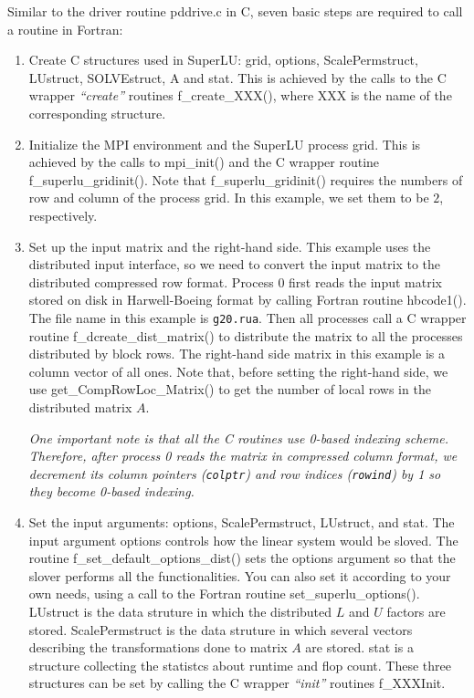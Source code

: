 Similar to the driver routine \textsf{pddrive.c} in C, seven basic steps are
required to call a {\superlud} routine in Fortran:
\begin{enumerate}

\item Create C structures used in SuperLU: \textsf{grid}, \textsf{options}, 
\textsf{ScalePermstruct}, \textsf{LUstruct}, \textsf{SOLVEstruct}, \textsf{A} 
and \textsf{stat}.
This is achieved by the calls to the C wrapper \emph{``create''} routines
\textsf{f\_create\_XXX()}, where \textsf{XXX} is the name of the corresponding
structure.

\item Initialize the MPI environment and the SuperLU process grid.
This is achieved by the calls to \textsf{mpi\_init()} and the C wrapper
routine \textsf{f\_superlu\_gridinit()}. Note that
\textsf{f\_superlu\_gridinit()} requires the numbers of row and column
of the process grid. In this example, we set them to be $2$, respectively.

\item Set up the input matrix and the right-hand side. This example uses
the distributed input interface, so we need to convert the input matrix
to the distributed compressed row format. 
Process $0$ first reads the input matrix stored on disk in Harwell-Boeing
format by calling Fortran routine \textsf{hbcode1()}. The file name in
this example is {\tt g20.rua}. Then all processes call a C wrapper
routine \textsf{f\_dcreate\_dist\_matrix()} to
distribute the matrix to all the processes distributed by block rows.
The right-hand side matrix in this example is a column vector
of all ones. Note that, before setting the right-hand side, we use
\textsf{get\_CompRowLoc\_Matrix()}
to get the number of local rows in the distributed matrix $A$.

{\em One important note is that all the C routines use 0-based indexing
scheme. Therefore, after process 0 reads the matrix in compressed
column format, we decrement its column pointers ({\tt colptr}) and
row indices ({\tt rowind}) by 1 so they become 0-based indexing.}


\item Set the input arguments: \textsf{options}, \textsf{ScalePermstruct},
\textsf{LUstruct}, and \textsf{stat}. The input argument \textsf{options}
controls how the linear system would be sloved. The routine
\textsf{f\_set\_default\_options\_dist()} sets the \textsf{options} argument
so that the slover performs all the functionalities. You can also set it
according to your own needs, using a call to the Fortran routine 
\textsf{set\_superlu\_options()}. \textsf{LUstruct} is the data struture
in which the distributed $L$ and $U$ factors are stored.
\textsf{ScalePermstruct} is the data struture in 
which several vectors describing the transformations done to matrix $A$ are
stored. \textsf{stat} is a structure collecting the statistcs about runtime
and flop count. These three structures can be set by calling the C wrapper
\emph{``init''} routines \textsf{f\_XXXInit}.


\end{enumerate}
